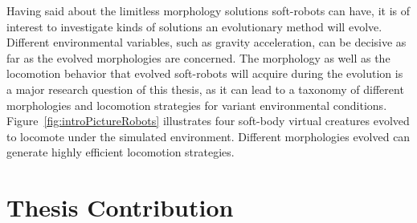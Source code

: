 Having said about the limitless morphology solutions soft-robots can have, it is of interest to investigate kinds of solutions an evolutionary method will evolve. Different environmental variables, such as gravity acceleration, can be decisive as far as the evolved morphologies are concerned. The morphology as well as the locomotion behavior that evolved soft-robots will acquire during the evolution is a major research question of this thesis, as it can lead to a taxonomy of different morphologies and locomotion strategies for variant environmental conditions. Figure~\ref{fig:introPictureRobots} illustrates four soft-body virtual creatures evolved to locomote under the simulated environment. Different morphologies evolved can generate highly efficient locomotion strategies.


\section{Thesis Contribution}

